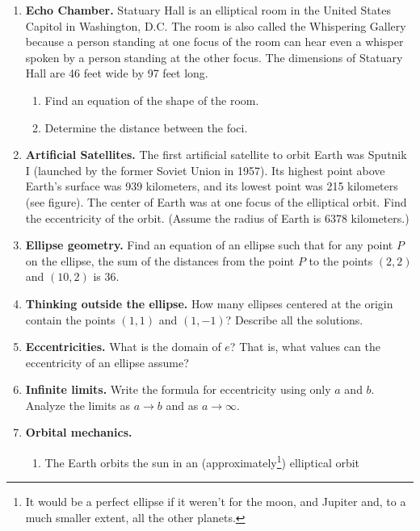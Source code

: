 \documentclass[11pt]{article}
\begin{document}
\begin{enumerate}
\def\labelenumi{\arabic{enumi}.}
\setcounter{enumi}{5}

\item
  \textbf{Echo Chamber.} Statuary Hall is an elliptical room in the United States Capitol in
  Washington, D.C. The room is also called the Whispering Gallery
  because a person standing at one focus of the room can hear even a
  whisper spoken by a person standing at the other focus. The dimensions
  of Statuary Hall are 46 feet wide by 97 feet long.

  \begin{enumerate}

  \item
    Find an equation of the shape of the room.
  \item
    Determine the distance between the foci.
  \end{enumerate}
\item
  \textbf{Artificial Satellites.} The first artificial satellite to orbit Earth was Sputnik I (launched
  by the former Soviet Union in 1957). Its highest point above Earth's
  surface was 939 kilometers, and its lowest point was 215 kilometers
  (see figure). The center of Earth was at one focus of the elliptical
  orbit. Find the eccentricity of the orbit. (Assume the radius of Earth
  is 6378 kilometers.)
\item
  \textbf{Ellipse geometry.}
	Find an equation of an ellipse such that for any point \(P\) on the
  ellipse, the sum of the distances from the point \(P\) to the points
  \((2, 2)\) and \((10, 2)\) is 36.
\item
	\textbf{Thinking outside the ellipse.}
  How many ellipses centered at the origin contain the points \((1,1)\)
  and \((1,-1)\)? Describe all the solutions.
\item
	\textbf{Eccentricities.}
	What is the domain of $e$? That is, what values can the eccentricity of an ellipse assume?
\item
  \textbf{Infinite limits.}
	Write the formula for eccentricity using only \(a\) and \(b\). Analyze
  the limits as \(a \to b\) and as \(a \to \infty\).
\item
  \textbf{Orbital mechanics.}
  \begin{enumerate}
  \item
    The Earth orbits the sun in an (approximately\footnote{It would be a
      perfect ellipse if it weren't for the moon, and Jupiter and, to a
      much smaller extent, all the other planets.}) elliptical orbit

\end{enumerate}
\end{enumerate}
\end{document}
